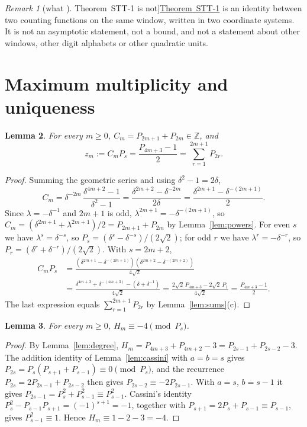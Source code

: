 \documentclass[11pt]{amsart}
\newtheorem{lemma}{Lemma}[section]
\theoremstyle{definition}
\theoremstyle{remark}
\newtheorem{remark}[lemma]{Remark}
\theoremstyle{plain}
\numberwithin{equation}{section}
\newcommand{\Z}{\mathbb{Z}}
\newcommand{\STTone}{\hyperref[thm:stt1]{Theorem~STT-1}}
\begin{document}
\begin{remark}[what \STTone{} is not]\label{rem:notstt1}
\STTone{} is an identity between two counting functions on the same window, written in two
coordinate systems. It is not an asymptotic statement, not a bound, and not a statement about other
windows, other digit alphabets or other quadratic units.
\end{remark}

\section{Maximum multiplicity and uniqueness}\label{sec:stt2}

\begin{lemma}\label{lem:Cm}
For every $m\ge0$, $C_m=P_{2m+1}+P_{2m}\in\Z$, and
\[
z_m:=C_mP_s=\frac{P_{4m+3}-1}{2}=\sum_{r=1}^{2m+1}P_{2r}.
\]
\end{lemma}

\begin{proof}
Summing the geometric series and using $\delta^2-1=2\delta$,
\[
C_m=\delta^{-2m}\,\frac{\delta^{4m+2}-1}{\delta^2-1}=\frac{\delta^{2m+2}-\delta^{-2m}}{2\delta}
=\frac{\delta^{2m+1}-\delta^{-(2m+1)}}{2}.
\]
Since $\lambda=-\delta^{-1}$ and $2m+1$ is odd, $\lambda^{2m+1}=-\delta^{-(2m+1)}$, so
$C_m=(\delta^{2m+1}+\lambda^{2m+1})/2=P_{2m+1}+P_{2m}$ by Lemma~\ref{lem:powers}. For even $s$ we have
$\lambda^s=\delta^{-s}$, so $P_s=(\delta^s-\delta^{-s})/(2\sqrt2)$; for odd $r$ we have
$\lambda^r=-\delta^{-r}$, so $P_r=(\delta^r+\delta^{-r})/(2\sqrt2)$. With $s=2m+2$,
\begin{align*}
C_mP_s&=\frac{(\delta^{2m+1}-\delta^{-(2m+1)})(\delta^{2m+2}-\delta^{-(2m+2)})}{4\sqrt2}\\
&=\frac{\delta^{4m+3}+\delta^{-(4m+3)}-(\delta+\delta^{-1})}{4\sqrt2}
=\frac{2\sqrt2\,P_{4m+3}-2\sqrt2\,P_1}{4\sqrt2}=\frac{P_{4m+3}-1}{2}.
\end{align*}
The last expression equals $\sum_{r=1}^{2m+1}P_{2r}$ by Lemma~\ref{lem:sums}(c).
\end{proof}

\begin{lemma}\label{lem:residue}
For every $m\ge0$, $H_m\equiv-4\pmod{P_s}$.
\end{lemma}

\begin{proof}
By Lemma~\ref{lem:degree}, $H_m=P_{4m+3}+P_{4m+2}-3=P_{2s-1}+P_{2s-2}-3$. The addition identity of
Lemma~\ref{lem:cassini} with $a=b=s$ gives $P_{2s}=P_s(P_{s+1}+P_{s-1})\equiv0\pmod{P_s}$, and the
recurrence $P_{2s}=2P_{2s-1}+P_{2s-2}$ then gives $P_{2s-2}\equiv-2P_{2s-1}$. With $a=s$, $b=s-1$
it gives $P_{2s-1}=P_s^2+P_{s-1}^2\equiv P_{s-1}^2$. Cassini's identity
$P_s^2-P_{s-1}P_{s+1}=(-1)^{s+1}=-1$, together with $P_{s+1}=2P_s+P_{s-1}\equiv P_{s-1}$, gives
$P_{s-1}^2\equiv1$. Hence $H_m\equiv1-2-3=-4$.
\end{proof}
\end{document}
